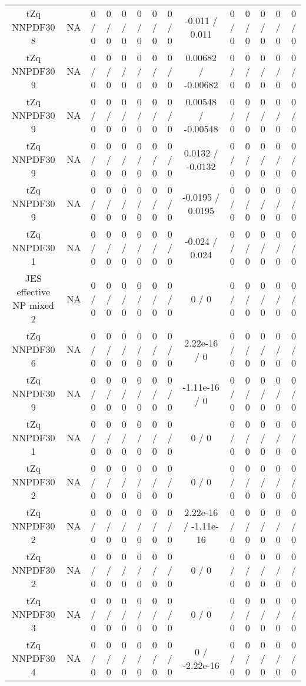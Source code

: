 \documentclass[10pt]{article}
\begin{document}
\begin{table}[htbp]
\begin{center}
\begin{tabular}{|c|c|c|c|c|c|c|c|c|c|c|c|c|c|}
  tZq NNPDF30 8 &    NA    & 0 / 0 & 0 / 0 & 0 / 0 & 0 / 0 & 0 / 0 & 0 / 0 & -0.011 / 0.011 & 0 / 0 & 0 / 0 & 0 / 0 & 0 / 0 & 0 / 0 \\ 
  tZq NNPDF30 9 &    NA    & 0 / 0 & 0 / 0 & 0 / 0 & 0 / 0 & 0 / 0 & 0 / 0 & 0.00682 / -0.00682 & 0 / 0 & 0 / 0 & 0 / 0 & 0 / 0 & 0 / 0 \\ 
  tZq NNPDF30 9 &    NA    & 0 / 0 & 0 / 0 & 0 / 0 & 0 / 0 & 0 / 0 & 0 / 0 & 0.00548 / -0.00548 & 0 / 0 & 0 / 0 & 0 / 0 & 0 / 0 & 0 / 0 \\ 
  tZq NNPDF30 9 &    NA    & 0 / 0 & 0 / 0 & 0 / 0 & 0 / 0 & 0 / 0 & 0 / 0 & 0.0132 / -0.0132 & 0 / 0 & 0 / 0 & 0 / 0 & 0 / 0 & 0 / 0 \\ 
  tZq NNPDF30 9 &    NA    & 0 / 0 & 0 / 0 & 0 / 0 & 0 / 0 & 0 / 0 & 0 / 0 & -0.0195 / 0.0195 & 0 / 0 & 0 / 0 & 0 / 0 & 0 / 0 & 0 / 0 \\ 
  tZq NNPDF30 1 &    NA    & 0 / 0 & 0 / 0 & 0 / 0 & 0 / 0 & 0 / 0 & 0 / 0 & -0.024 / 0.024 & 0 / 0 & 0 / 0 & 0 / 0 & 0 / 0 & 0 / 0 \\ 
  JES effective NP mixed 2 &    NA    & 0 / 0 & 0 / 0 & 0 / 0 & 0 / 0 & 0 / 0 & 0 / 0 & 0 / 0 & 0 / 0 & 0 / 0 & 0 / 0 & 0 / 0 & 0 / 0 \\ 
  tZq NNPDF30 6 &    NA    & 0 / 0 & 0 / 0 & 0 / 0 & 0 / 0 & 0 / 0 & 0 / 0 & 2.22e-16 / 0 & 0 / 0 & 0 / 0 & 0 / 0 & 0 / 0 & 0 / 0 \\ 
  tZq NNPDF30 9 &    NA    & 0 / 0 & 0 / 0 & 0 / 0 & 0 / 0 & 0 / 0 & 0 / 0 & -1.11e-16 / 0 & 0 / 0 & 0 / 0 & 0 / 0 & 0 / 0 & 0 / 0 \\ 
  tZq NNPDF30 1 &    NA    & 0 / 0 & 0 / 0 & 0 / 0 & 0 / 0 & 0 / 0 & 0 / 0 & 0 / 0 & 0 / 0 & 0 / 0 & 0 / 0 & 0 / 0 & 0 / 0 \\ 
  tZq NNPDF30 2 &    NA    & 0 / 0 & 0 / 0 & 0 / 0 & 0 / 0 & 0 / 0 & 0 / 0 & 0 / 0 & 0 / 0 & 0 / 0 & 0 / 0 & 0 / 0 & 0 / 0 \\ 
  tZq NNPDF30 2 &    NA    & 0 / 0 & 0 / 0 & 0 / 0 & 0 / 0 & 0 / 0 & 0 / 0 & 2.22e-16 / -1.11e-16 & 0 / 0 & 0 / 0 & 0 / 0 & 0 / 0 & 0 / 0 \\ 
  tZq NNPDF30 2 &    NA    & 0 / 0 & 0 / 0 & 0 / 0 & 0 / 0 & 0 / 0 & 0 / 0 & 0 / 0 & 0 / 0 & 0 / 0 & 0 / 0 & 0 / 0 & 0 / 0 \\ 
  tZq NNPDF30 3 &    NA    & 0 / 0 & 0 / 0 & 0 / 0 & 0 / 0 & 0 / 0 & 0 / 0 & 0 / 0 & 0 / 0 & 0 / 0 & 0 / 0 & 0 / 0 & 0 / 0 \\ 
  tZq NNPDF30 4 &    NA    & 0 / 0 & 0 / 0 & 0 / 0 & 0 / 0 & 0 / 0 & 0 / 0 & 0 / -2.22e-16 & 0 / 0 & 0 / 0 & 0 / 0 & 0 / 0 & 0 / 0 \\ 

\end{tabular}
\end{center}
\end{table}
\end{document}

